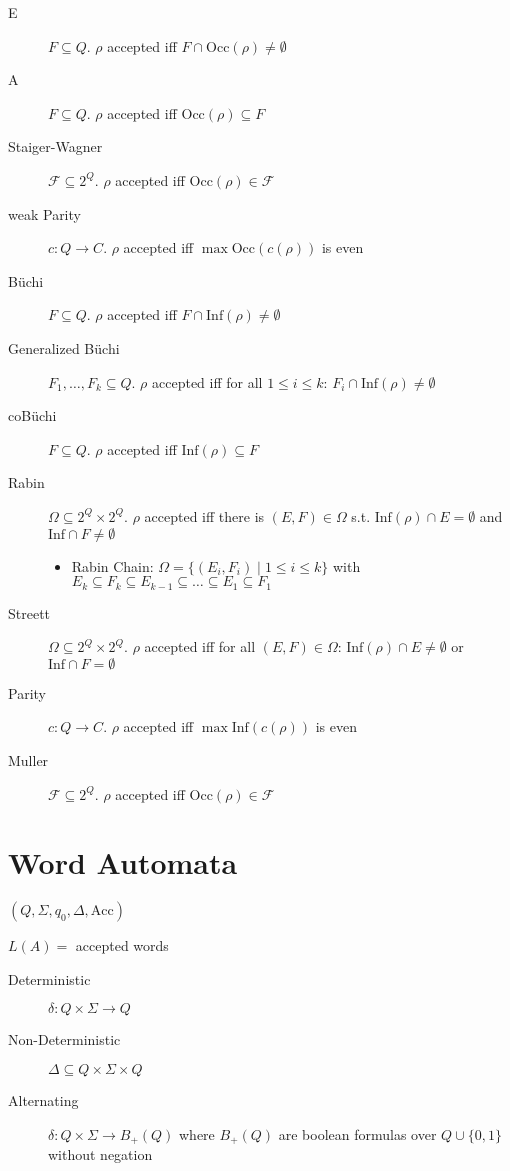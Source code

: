 \documentclass{article}
\begin{document}
\begin{description}
	\item[E] $F \subseteq Q$. $\rho$ accepted iff $F \cap \text{Occ}(\rho) \neq \emptyset$
	\item[A] $F \subseteq Q$. $\rho$ accepted iff $\text{Occ}(\rho) \subseteq F$
	\item[Staiger-Wagner] $\mathcal{F} \subseteq 2^Q$. $\rho$ accepted iff $\text{Occ}(\rho) \in \mathcal{F}$
	\item[weak Parity] $c : Q \rightarrow C$. $\rho$ accepted iff $\max \text{Occ}(c(\rho))$ is even
	\item[B\"uchi] $F \subseteq Q$. $\rho$ accepted iff $F \cap \text{Inf}(\rho) \neq \emptyset$
	\item[Generalized B\"uchi] $F_1, \dots, F_k \subseteq Q$. $\rho$ accepted iff for all $1 \leq i \leq k$: $F_i \cap \text{Inf}(\rho) \neq \emptyset$
	\item[coB\"uchi] $F \subseteq Q$. $\rho$ accepted iff $\text{Inf}(\rho) \subseteq F$
	\item[Rabin] $\Omega \subseteq 2^Q \times 2^Q$. $\rho$ accepted iff there is $(E, F) \in \Omega$ s.t. $\text{Inf}(\rho) \cap E = \emptyset$ and $\text{Inf} \cap F \neq \emptyset$
	\begin{itemize}
		\item Rabin Chain: $\Omega = \{(E_i, F_i) \mid 1 \leq i \leq k\}$ with $E_k \subseteq F_k \subseteq E_{k-1} \subseteq \dots \subseteq E_1 \subseteq F_1$
	\end{itemize}
	\item[Streett] $\Omega \subseteq 2^Q \times 2^Q$. $\rho$ accepted iff for all $(E, F) \in \Omega$: $\text{Inf}(\rho) \cap E \neq \emptyset$ or $\text{Inf} \cap F = \emptyset$
	\item[Parity] $c : Q \rightarrow C$. $\rho$ accepted iff $\max \text{Inf}(c(\rho))$ is even
	\item[Muller] $\mathcal{F} \subseteq 2^Q$. $\rho$ accepted iff $\text{Occ}(\rho) \in \mathcal{F}$
\end{description}



\newpage
\section{Word Automata}
$(Q, \Sigma, q_0, \Delta, \text{Acc})$

$L(A) = $ accepted words

\begin{description}
	\item[Deterministic] $\delta : Q \times \Sigma \rightarrow Q$
	\item[Non-Deterministic] $\Delta \subseteq Q \times \Sigma \times Q$
	\item[Alternating] $\delta : Q \times \Sigma \rightarrow B_+(Q)$ where $B_+(Q)$ are boolean formulas over $Q \cup \{0, 1\}$ without negation
\end{description}
\end{document}

